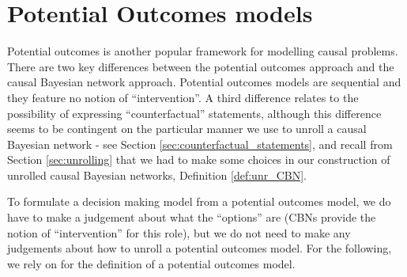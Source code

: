
\section{Potential Outcomes models}\label{sec:potential_outcomes}

Potential outcomes is another popular framework for modelling causal problems. There are two key differences between the potential outcomes approach and the causal Bayesian network approach. Potential outcomes models are sequential and they feature no notion of ``intervention''. A third difference relates to the possibility of expressing ``counterfactual'' statements, although this difference seems to be contingent on the particular manner we use to unroll a causal Bayesian network - see Section \ref{sec:counterfactual_statements}, and recall from Section \ref{sec:unrolling} that we had to make some choices in our construction of unrolled causal Bayesian networks, Definition \ref{def:unr_CBN}.

To formulate a decision making model from a potential outcomes model, we do have to make a judgement about what the ``options'' are (CBNs provide the notion of ``intervention'' for this role), but we do not need to make any judgements about how to unroll a potential outcomes model. For the following, we rely on \citet{rubin_causal_2005} for the definition of a potential outcomes model.

